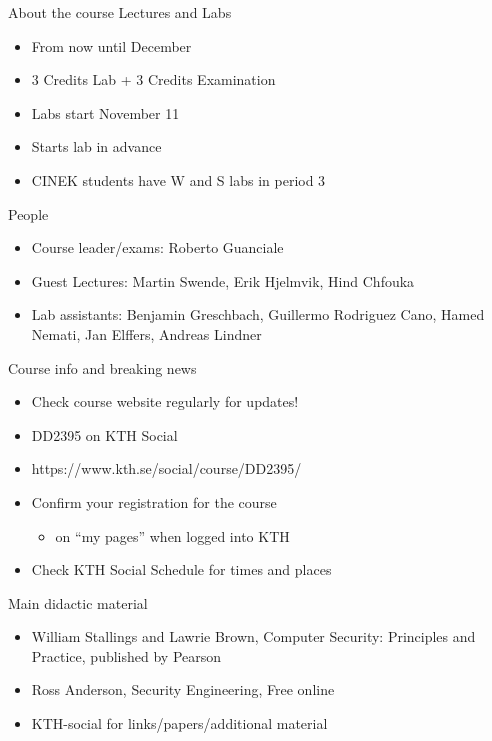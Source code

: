 \documentclass{beamer}
\begin{document}
\begin{frame}{About the course}
  Lectures and Labs
  \begin{itemize}
    \item From now until December
    \item 3 Credits Lab + 3 Credits Examination
    \item Labs start November 11
    \item Starts lab in advance
    \item CINEK students have W and S labs in period 3
  \end{itemize}
\end{frame}


\begin{frame}{People}
  \begin{itemize}
    \item Course leader/exams: Roberto Guanciale
    \item Guest Lectures: 
      Martin Swende,
      Erik Hjelmvik,
      Hind Chfouka
    \item Lab assistants: 
      Benjamin Greschbach,
      Guillermo Rodriguez Cano,
      Hamed Nemati,
      Jan Elffers,
      Andreas Lindner
  \end{itemize}
\end{frame}

\begin{frame}{Course info and breaking news}
  \begin{itemize}
    \item Check course website regularly for updates!
    \item DD2395 on KTH Social
    \item https://www.kth.se/social/course/DD2395/
    \item \alert{Confirm your registration for the course}
      \begin{itemize}
        \item on ``my pages'' when logged into KTH
      \end{itemize}
    \item Check KTH Social Schedule for times and places
  \end{itemize}
\end{frame}


\begin{frame}{Main didactic material}
  \begin{itemize}
  \item William Stallings and Lawrie Brown, Computer Security:
    Principles and Practice, published by Pearson 
  \item Ross Anderson, Security Engineering, Free online
  \item KTH-social for links/papers/additional material
  \end{itemize}
\end{frame}
\end{document}
